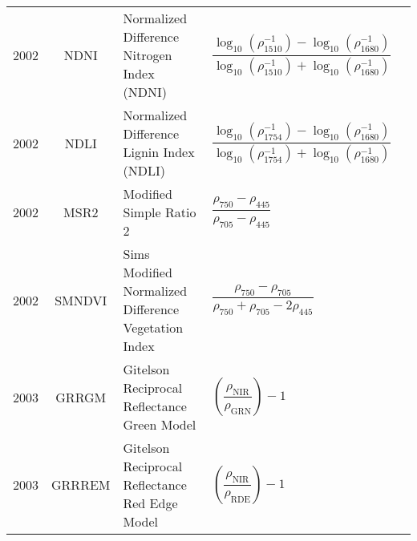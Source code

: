 \documentclass[10pt]{article}
\begin{document}
\begin{ThreePartTable}
\begin{longtable}{c c m{2.80in} M{2.80in} M{1.5in}}
  2002 & NDNI    & Normalized Difference Nitrogen Index (NDNI)                                    & $\dfrac{\log_{10}({\rho^{-1}_{1510}})-\log_{10}({\rho^{-1}_{1680}})}{\log_{10}({\rho^{-1}_{1510}})+\log_{10}({\rho^{-1}_{1680}})}$                                                                                                                                                      & \citet{Serrano2002}                                 \\
  2002 & NDLI    & Normalized Difference Lignin Index (NDLI)                                      & $\dfrac{\log_{10}({\rho^{-1}_{1754}})-\log_{10}({\rho^{-1}_{1680}})}{\log_{10}({\rho^{-1}_{1754}})+\log_{10}({\rho^{-1}_{1680}})}$                                                                                                                                                      & \citet{Serrano2002}                                 \\
  2002 & MSR2    & Modified Simple Ratio 2                                                        & $\dfrac{\rho_{750}-\rho_{445}}{\rho_{705}-\rho_{445}}$                                                                                                                                                                                                                                  & \citet{Sims2002}                                    \\
  2002 & SMNDVI  & Sims Modified Normalized Difference Vegetation Index                           & $\dfrac{\rho_{750}-\rho_{705}}{\rho_{750}+\rho_{705}-2\rho_{445}}$                                                                                                                                                                                                                      & \citet{Sims2002}                                    \\
  2003 & GRRGM   & Gitelson Reciprocal Reflectance Green Model                                    & $\left(\dfrac{\rho_\text{NIR}}{\rho_\text{GRN}}\right)-1$                                                                                                                                                                                                                               & \citet{Gitelson2003,Gitelson2005}                   \\
  2003 & GRRREM  & Gitelson Reciprocal Reflectance Red Edge Model                                 & $\left(\dfrac{\rho_\text{NIR}}{\rho_\text{RDE}}\right)-1$                                                                                                                                                                                                                               & \citet{Gitelson2003,Gitelson2005}                   \\

\end{longtable}
\end{ThreePartTable}
\end{document}
